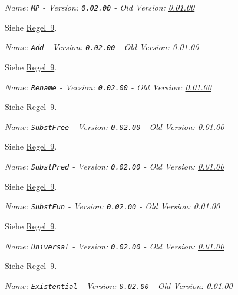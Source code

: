 \documentclass[a4paper,german,10pt,twoside]{book}
\theoremstyle{definition}
\theoremstyle{remark}
\begin{document}
\par
\label{rule:CP!MP} \hypertarget{rule:CP!MP}{}
{\em   Name: \verb]MP]  -  Version: \verb]0.02.00]  -  Old Version: \hyperlink{rule:modusPonens}{0.01.00}}

Siehe \hyperlink{rule:CP}{Regel~9}.


\par
\label{rule:CP!Add} \hypertarget{rule:CP!Add}{}
{\em   Name: \verb]Add]  -  Version: \verb]0.02.00]  -  Old Version: \hyperlink{rule:addProvenFormula}{0.01.00}}

Siehe \hyperlink{rule:CP}{Regel~9}.


\par
\label{rule:CP!Rename} \hypertarget{rule:CP!Rename}{}
{\em   Name: \verb]Rename]  -  Version: \verb]0.02.00]  -  Old Version: \hyperlink{rule:renameBound}{0.01.00}}

Siehe \hyperlink{rule:CP}{Regel~9}.


\par
\label{rule:CP!SubstFree} \hypertarget{rule:CP!SubstFree}{}
{\em   Name: \verb]SubstFree]  -  Version: \verb]0.02.00]  -  Old Version: \hyperlink{rule:replaceFree}{0.01.00}}

Siehe \hyperlink{rule:CP}{Regel~9}.


\par
\label{rule:CP!SubstPred} \hypertarget{rule:CP!SubstPred}{}
{\em   Name: \verb]SubstPred]  -  Version: \verb]0.02.00]  -  Old Version: \hyperlink{rule:replacePred}{0.01.00}}

Siehe \hyperlink{rule:CP}{Regel~9}.


\par
\label{rule:CP!SubstFun} \hypertarget{rule:CP!SubstFun}{}
{\em   Name: \verb]SubstFun]  -  Version: \verb]0.02.00]  -  Old Version: \hyperlink{rule:replaceFunct}{0.01.00}}

Siehe \hyperlink{rule:CP}{Regel~9}.


\par
\label{rule:CP!Universal} \hypertarget{rule:CP!Universal}{}
{\em   Name: \verb]Universal]  -  Version: \verb]0.02.00]  -  Old Version: \hyperlink{rule:universalGeneralization}{0.01.00}}

Siehe \hyperlink{rule:CP}{Regel~9}.


\par
\label{rule:CP!Existential} \hypertarget{rule:CP!Existential}{}
{\em   Name: \verb]Existential]  -  Version: \verb]0.02.00]  -  Old Version: \hyperlink{rule:existentialGeneralization}{0.01.00}}
\end{document}
